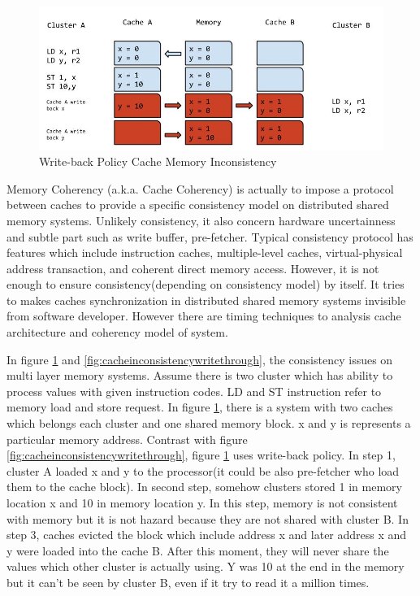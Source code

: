 \documentclass[informationsecurity]{gucmasterproject}
\begin{document}
\begin{figure}[h!]
    \centering
    \includegraphics[width=1\textwidth]{cacheinconsistencywriteback.jpg}
    \caption{Write-back Policy Cache Memory Inconsistency}
    \label{fig:cacheinconsistencywriteback}
\end{figure}

Memory Coherency (a.k.a. Cache Coherency) is actually to impose a protocol between caches to provide a specific consistency model on distributed shared memory systems. Unlikely consistency, it also concern hardware uncertainness and 
subtle part such as write buffer, pre-fetcher. Typical consistency protocol has features which include instruction caches, multiple-level caches, virtual-physical address transaction, and coherent direct memory access. However, it is not enough to ensure consistency(depending on consistency model) by itself. It tries to makes caches synchronization in distributed shared memory systems invisible from software developer. However there are timing techniques to analysis cache architecture and coherency model of system. 

In figure \ref{fig:cacheinconsistencywriteback} and \ref{fig:cacheinconsistencywritethrough}, the consistency issues on multi layer memory systems. Assume there is two cluster which has ability to process values with given instruction codes. LD and ST instruction refer to memory load and store request. In figure \ref{fig:cacheinconsistencywriteback}, there is a system with two caches which belongs each cluster and one shared memory block. x and y is represents a particular memory address. Contrast with figure \ref{fig:cacheinconsistencywritethrough}, figure \ref{fig:cacheinconsistencywriteback} uses write-back policy. In step 1, cluster A loaded x and y to the processor(it could be also pre-fetcher who load them to the cache block). In second step, somehow clusters stored 1 in memory location x and 10 in memory location y. In this step, memory is not consistent with memory but it is not hazard because they are not shared with cluster B. In step 3, caches evicted the block which include address x and later address x and y were loaded into the cache B. After this moment, they will never share the values which other cluster is actually using. Y was 10 at the end in the memory but it can't be seen by cluster B, even if it try to read it a million times. 
\end{document}

